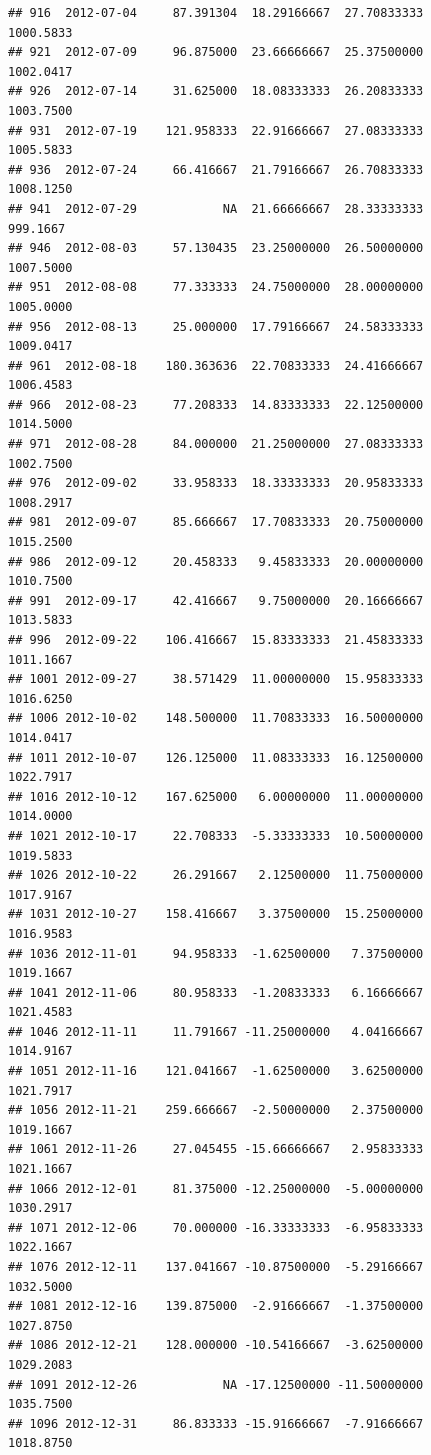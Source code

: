 \documentclass[
]{article}
\begin{document}
\begin{verbatim}
## 916  2012-07-04     87.391304  18.29166667  27.70833333    1000.5833
## 921  2012-07-09     96.875000  23.66666667  25.37500000    1002.0417
## 926  2012-07-14     31.625000  18.08333333  26.20833333    1003.7500
## 931  2012-07-19    121.958333  22.91666667  27.08333333    1005.5833
## 936  2012-07-24     66.416667  21.79166667  26.70833333    1008.1250
## 941  2012-07-29            NA  21.66666667  28.33333333     999.1667
## 946  2012-08-03     57.130435  23.25000000  26.50000000    1007.5000
## 951  2012-08-08     77.333333  24.75000000  28.00000000    1005.0000
## 956  2012-08-13     25.000000  17.79166667  24.58333333    1009.0417
## 961  2012-08-18    180.363636  22.70833333  24.41666667    1006.4583
## 966  2012-08-23     77.208333  14.83333333  22.12500000    1014.5000
## 971  2012-08-28     84.000000  21.25000000  27.08333333    1002.7500
## 976  2012-09-02     33.958333  18.33333333  20.95833333    1008.2917
## 981  2012-09-07     85.666667  17.70833333  20.75000000    1015.2500
## 986  2012-09-12     20.458333   9.45833333  20.00000000    1010.7500
## 991  2012-09-17     42.416667   9.75000000  20.16666667    1013.5833
## 996  2012-09-22    106.416667  15.83333333  21.45833333    1011.1667
## 1001 2012-09-27     38.571429  11.00000000  15.95833333    1016.6250
## 1006 2012-10-02    148.500000  11.70833333  16.50000000    1014.0417
## 1011 2012-10-07    126.125000  11.08333333  16.12500000    1022.7917
## 1016 2012-10-12    167.625000   6.00000000  11.00000000    1014.0000
## 1021 2012-10-17     22.708333  -5.33333333  10.50000000    1019.5833
## 1026 2012-10-22     26.291667   2.12500000  11.75000000    1017.9167
## 1031 2012-10-27    158.416667   3.37500000  15.25000000    1016.9583
## 1036 2012-11-01     94.958333  -1.62500000   7.37500000    1019.1667
## 1041 2012-11-06     80.958333  -1.20833333   6.16666667    1021.4583
## 1046 2012-11-11     11.791667 -11.25000000   4.04166667    1014.9167
## 1051 2012-11-16    121.041667  -1.62500000   3.62500000    1021.7917
## 1056 2012-11-21    259.666667  -2.50000000   2.37500000    1019.1667
## 1061 2012-11-26     27.045455 -15.66666667   2.95833333    1021.1667
## 1066 2012-12-01     81.375000 -12.25000000  -5.00000000    1030.2917
## 1071 2012-12-06     70.000000 -16.33333333  -6.95833333    1022.1667
## 1076 2012-12-11    137.041667 -10.87500000  -5.29166667    1032.5000
## 1081 2012-12-16    139.875000  -2.91666667  -1.37500000    1027.8750
## 1086 2012-12-21    128.000000 -10.54166667  -3.62500000    1029.2083
## 1091 2012-12-26            NA -17.12500000 -11.50000000    1035.7500
## 1096 2012-12-31     86.833333 -15.91666667  -7.91666667    1018.8750

\end{verbatim}
\end{document}
